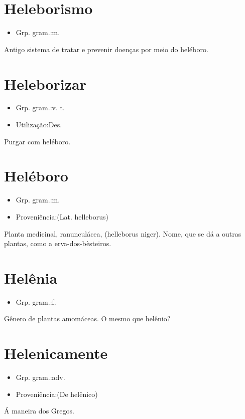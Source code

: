 \documentclass{article}
\begin{document}
\section{Heleborismo}
\begin{itemize}
\item {Grp. gram.:m.}
\end{itemize}
Antigo sistema de tratar e prevenir doenças por meio do heléboro.
\section{Heleborizar}
\begin{itemize}
\item {Grp. gram.:v. t.}
\end{itemize}
\begin{itemize}
\item {Utilização:Des.}
\end{itemize}
Purgar com heléboro.
\section{Heléboro}
\begin{itemize}
\item {Grp. gram.:m.}
\end{itemize}
\begin{itemize}
\item {Proveniência:(Lat. \textunderscore helleborus\textunderscore )}
\end{itemize}
Planta medicinal, ranunculácea, (\textunderscore helleborus niger\textunderscore ).
Nome, que se dá a outras plantas, como a \textunderscore erva-dos-bèsteiros\textunderscore .
\section{Helênia}
\begin{itemize}
\item {Grp. gram.:f.}
\end{itemize}
Gênero de plantas amomáceas.
O mesmo que \textunderscore helênio\textunderscore ?
\section{Helenicamente}
\begin{itemize}
\item {Grp. gram.:adv.}
\end{itemize}
\begin{itemize}
\item {Proveniência:(De \textunderscore helênico\textunderscore )}
\end{itemize}
Á maneira dos Gregos.
\end{document}
